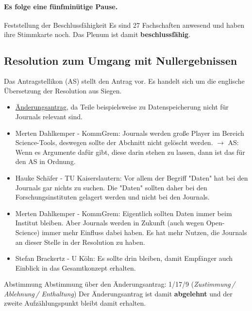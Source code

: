     \paragraph{Es folge eine fünfminütige Pause.}

    \begin{success}{Feststellung der Beschlussfähigkeit}
      Es sind 27 Fachschaften anwesend und haben ihre Stimmkarte noch.
      Das Plenum ist damit \textbf{beschlussfähig}.
    \end{success}

  \subsection*{Resolution zum Umgang mit Nullergebnissen}
    Das Antragstellikon (AS) stellt den Antrag vor. Es handelt sich um die englische Übersetzung der Resolution aus Siegen.
    \begin{itemize}
      \item \uline{Änderungsantrag}, da Teile beispielsweise zu Datenspeicherung nicht für Journals relevant sind.
      \item Merten Dahlkemper - KommGrem:  Journals werden große Player im Bereich Science-Tools, deswegen sollte der Abchnitt nicht gelöscht werden.
        $\rightarrow$ AS: Wenn es Argumente dafür gibt, diese darin stehen zu lassen, dann ist das für den AS in Ordnung.
      \item Hauke Schäfer - TU Kaiserslautern:  Vor allem der Begriff "Daten" hat bei den Journals gar nichts zu suchen. Die "Daten" sollten daher bei den Forschungsinstituten gelagert werden und nicht bei den Journals.
      \item Merten Dahlkemper - KommGrem:  Eigentlich sollten Daten immer beim Institut bleiben. Aber Journals werden in Zukunft (auch wegen Open-Science) immer mehr Einfluss dabei haben.
      Es hat mehr Nutzen, die Journals an dieser Stelle in der Resolution zu haben.
      \item Stefan Brackertz - U Köln:  Es sollte drin bleiben, damit Empfänger auch Einblick in das Gesamtkonzept erhalten.
    \end{itemize}

    \begin{danger}{Abstimmung}
      Abstimmung über den Änderungsantrag: 1/17/9 (\textit{Zustimmung\,/ Ablehnung\,/ Enthaltung})
      Der Änderungsantrag ist damit \textbf{abgelehnt} und der zweite Aufzählungspunkt bleibt damit erhalten.
    \end{danger}

